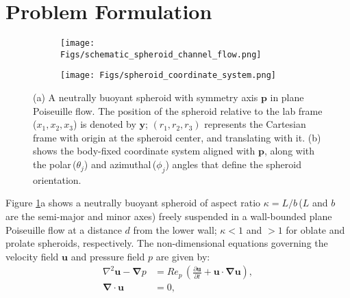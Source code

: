 \documentclass{jfm}
\begin{document}
\section{Problem Formulation} \label{sec:Ch3formulation}
\begin{figure}
	\centering
    \begin{subfigure}[b]{0.59\textwidth}
		\texttt{[image: Figs/schematic\_spheroid\_channel\_flow.png]}
        \caption{}
    \end{subfigure}
    \hfill
    \begin{subfigure}[b]{0.39\textwidth}
		\texttt{[image: Figs/spheroid\_coordinate\_system.png]}
        \caption{}
    \end{subfigure}
	\caption{(a) A neutrally buoyant spheroid with symmetry axis $\bm{p}$ in plane Poiseuille flow. The position of the spheroid relative to the lab frame ($x_1,x_2,x_3$) is denoted by $\bm{y}$; $(r_1,r_2,r_3)$ represents the Cartesian frame with origin at the spheroid center, and translating with it. (b) shows the body-fixed coordinate system aligned with $\bm{p}$, along with the polar\,($\theta_j$) and azimuthal\,($\phi_j$) angles that define the spheroid orientation.}
	\label{fig:Ch3channelGeometry}
\end{figure}
Figure \ref{fig:Ch3channelGeometry}a shows a neutrally buoyant spheroid of aspect ratio $\kappa=L/b$\,($L$ and $b$ are the semi-major and minor axes) freely suspended in a wall-bounded plane Poiseuille flow at a distance $d$ from the lower wall; $\kappa<1$ and $>1$ for oblate and prolate spheroids, respectively.
The non-dimensional equations governing the velocity field $\bm{u}$ and pressure field $p$ are given by:
\begin{subequations}
	\begin{align}
	\nabla^2 \bm{u}-\bm{\nabla}p &=Re_p\,\left(\frac{\partial\bm{u}}{\partial t}+\bm{u\cdot\nabla u}\right),\\
	\bm{\nabla}\cdot\bm{u}&=0 ,
	\end{align} \label{eq:Ch3NS1}
\end{subequations}
\end{document}
